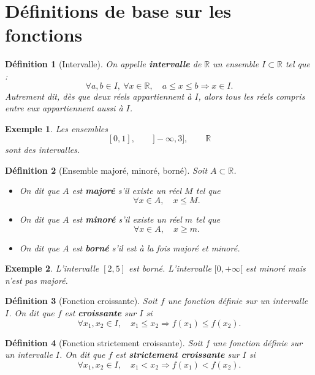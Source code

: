 \documentclass[11pt,a4paper]{article}
\newtheorem{definition}{Définition}[section]
\newtheorem*{exemple}{Exemple}
\newcommand{\R}{\mathbb{R}}
\begin{document}
\section{Définitions de base sur les fonctions}

\begin{definition}[Intervalle]
On appelle \textbf{intervalle} de \(\R\) un ensemble \(I\subset \R\) tel que :
\[
\forall a,b\in I,\ \forall x\in \R,\quad a\le x\le b \Rightarrow x\in I.
\]
Autrement dit, dès que deux réels appartiennent à \(I\), alors tous les réels compris entre eux appartiennent aussi à \(I\).
\end{definition}

\begin{exemple}
Les ensembles
\[
[0,1],\qquad ]-\infty,3],\qquad \R
\]
sont des intervalles.
\end{exemple}

\begin{definition}[Ensemble majoré, minoré, borné]
Soit \(A\subset \R\).
\begin{itemize}
    \item On dit que \(A\) est \textbf{majoré} s'il existe un réel \(M\) tel que
    \[
    \forall x\in A,\quad x\le M.
    \]
    \item On dit que \(A\) est \textbf{minoré} s'il existe un réel \(m\) tel que
    \[
    \forall x\in A,\quad x\ge m.
    \]
    \item On dit que \(A\) est \textbf{borné} s'il est à la fois majoré et minoré.
\end{itemize}
\end{definition}

\begin{exemple}
L'intervalle \([2,5]\) est borné.  
L'intervalle \([0,+\infty[\) est minoré mais n'est pas majoré.
\end{exemple}

\begin{definition}[Fonction croissante]
Soit \(f\) une fonction définie sur un intervalle \(I\).  
On dit que \(f\) est \textbf{croissante} sur \(I\) si
\[
\forall x_1,x_2\in I,\quad x_1\le x_2 \Rightarrow f(x_1)\le f(x_2).
\]
\end{definition}

\begin{definition}[Fonction strictement croissante]
Soit \(f\) une fonction définie sur un intervalle \(I\).  
On dit que \(f\) est \textbf{strictement croissante} sur \(I\) si
\[
\forall x_1,x_2\in I,\quad x_1<x_2 \Rightarrow f(x_1)<f(x_2).
\]
\end{definition}
\end{document}
